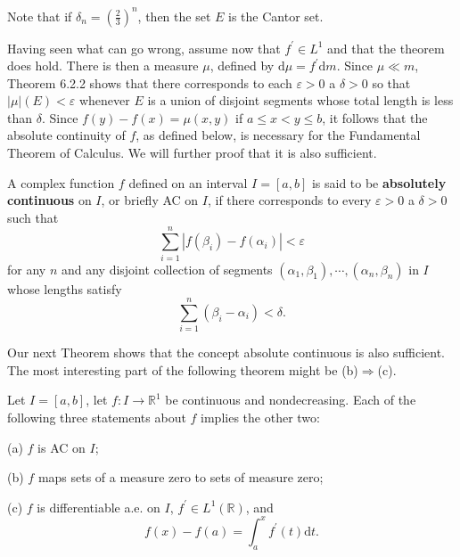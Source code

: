 Note that if $\delta_n=\left(\frac{2}{3}\right)^n$, then the set $E$ is the Cantor set.\par
Having seen what can go wrong, assume now that $f^\prime\in L^1$ and that the theorem does hold. There is then a measure $\mu$, defined by $\mathrm{d}\mu=f^\prime\mathrm{d}m$. Since $\mu\ll m$, Theorem 6.2.2 shows that there corresponds to each $\varepsilon>0$ a $\delta>0$ so that $|\mu|(E)<\varepsilon$ whenever $E$ is a union of disjoint segments whose total length is less than $\delta$. Since $f(y)-f(x)=\mu(x,y)$ if $a\le x<y\le b$, it follows that the absolute continuity of $f$, as defined below, is necessary for the Fundamental Theorem of Calculus. We will further proof that it is also sufficient.
\begin{definition}
A complex function $f$ defined on an interval $I=[a,b]$ is said to be \textbf{absolutely continuous} on $I$, or briefly AC on $I$, if there corresponds to every $\varepsilon>0$ a $\delta>0$ such that 
$$
\sum_{i=1}^n{\left| f\left( \beta _i \right) -f\left( \alpha _i \right) \right|}<\varepsilon 
$$
for any $n$ and any disjoint collection of segments $(\alpha_1,\beta_1),\cdots,(\alpha_n,\beta_n)$ in $I$ whose lengths satisfy 
$$
\sum_{i=1}^n{\left( \beta _i-\alpha _i \right)}<\delta .
$$
\end{definition}
Our next Theorem shows that the concept absolute continuous is also sufficient. The most interesting part of the following theorem might be (b)$\Rightarrow$(c).
\begin{theorem}
Let $I=[a,b]$, let $f:I\to\mathbb{R}^1$ be continuous and nondecreasing. Each of the following three statements about $f$ implies the other two:\par
(a) $f$ is AC on $I$;\par
(b) $f$ maps sets of a measure zero to sets of measure zero;\par
(c) $f$ is differentiable a.e. on $I$, $f^\prime\in L^1(\mathbb{R})$, and 
$$
f\left( x \right) -f\left( a \right) =\int_a^x{f^{\prime}\left( t \right) \mathrm{d}t}.
$$
\end{theorem}
